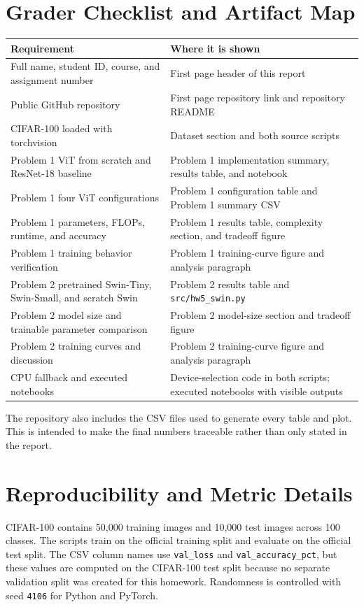 \documentclass[11pt]{article}
\begin{document}
\section*{Grader Checklist and Artifact Map}
\begin{center}
\scriptsize
\begin{tabular}{|p{2.45in}|p{3.7in}|}
\hline
Requirement & Where it is shown \\
\hline
Full name, student ID, course, and assignment number & First page header of this report \\
\hline
Public GitHub repository & First page repository link and repository README \\
\hline
CIFAR-100 loaded with torchvision & Dataset section and both source scripts \\
\hline
Problem 1 ViT from scratch and ResNet-18 baseline & Problem 1 implementation summary, results table, and notebook \\
\hline
Problem 1 four ViT configurations & Problem 1 configuration table and Problem 1 summary CSV \\
\hline
Problem 1 parameters, FLOPs, runtime, and accuracy & Problem 1 results table, complexity section, and tradeoff figure \\
\hline
Problem 1 training behavior verification & Problem 1 training-curve figure and analysis paragraph \\
\hline
Problem 2 pretrained Swin-Tiny, Swin-Small, and scratch Swin & Problem 2 results table and \texttt{src/hw5\_swin.py} \\
\hline
Problem 2 model size and trainable parameter comparison & Problem 2 model-size section and tradeoff figure \\
\hline
Problem 2 training curves and discussion & Problem 2 training-curve figure and analysis paragraph \\
\hline
CPU fallback and executed notebooks & Device-selection code in both scripts; executed notebooks with visible outputs \\
\hline
\end{tabular}
\end{center}

The repository also includes the CSV files used to generate every table and plot. This is intended to make the final numbers traceable rather than only stated in the report.

\section*{Reproducibility and Metric Details}
CIFAR-100 contains 50,000 training images and 10,000 test images across 100 classes. The scripts train on the official training split and evaluate on the official test split. The CSV column names use \texttt{val\_loss} and \texttt{val\_accuracy\_pct}, but these values are computed on the CIFAR-100 test split because no separate validation split was created for this homework. Randomness is controlled with seed \texttt{4106} for Python and PyTorch.
\end{document}
